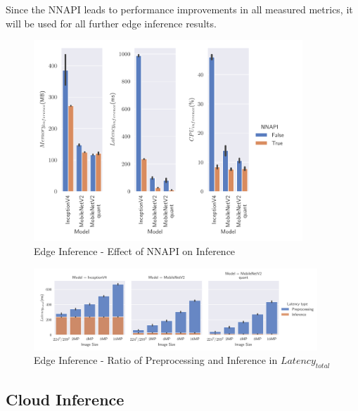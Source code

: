 Since the NNAPI leads to performance improvements in all measured metrics, it will be used for all further edge inference results.
\begin{figure}[H]
\centering
\includegraphics[width=0.9\textwidth]{./Bilder/single_plots/edge_inference_plots/NNAPI_behavior.pdf}
\caption{Edge Inference - Effect of NNAPI on Inference}
\label{fig:NNAPI}
\end{figure}



\begin{figure}[H]
\centering
\includegraphics[width=0.95\textwidth]{./Bilder/single_plots/edge_inference_plots/Edge_Preprocessing_+_Inference.pdf}
\caption{Edge Inference - Ratio of Preprocessing and Inference in $Latency_{total}$}
\label{fig:EdgeInferenceRatio}
\end{figure}

\subsection{Cloud Inference}
